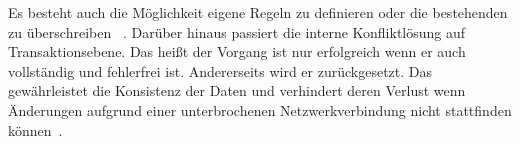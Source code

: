 Es besteht auch die Möglichkeit eigene Regeln zu definieren oder die bestehenden zu überschreiben ~\cite{realm_conflict}.
Darüber hinaus passiert die interne Konfliktlösung auf Transaktionsebene. Das heißt der Vorgang ist nur erfolgreich wenn er auch vollständig und fehlerfrei ist. Andererseits wird er zurückgesetzt. Das gewährleistet die Konsistenz der Daten und verhindert deren Verlust wenn Änderungen aufgrund einer unterbrochenen Netzwerkverbindung nicht stattfinden können~\cite{realm_offline_whitepaper}.